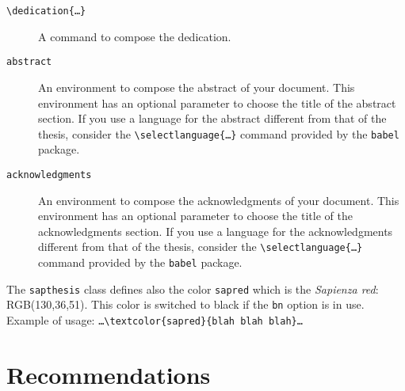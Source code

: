 \documentclass[a5paper,11pt]{article}
\newcommand{\bs}{\textbackslash}
\begin{document}
\begin{description}

\item[\texttt{\bs dedication\{\dots\}}] A command to compose the dedication.

\item[\texttt{abstract}] An environment to compose the abstract of your document. This environment has an optional parameter to choose the title of the abstract section.
If you use a language for the abstract different from that of the thesis, consider the \texttt{\bs selectlanguage\{\dots\}} command provided by the \texttt{babel} package.

\item[\texttt{acknowledgments}] An environment to compose the acknowledgments of your document. This environment has an optional parameter to choose the title of the acknowledgments section.
If you use a language for the acknowledgments different from that of the thesis, consider the \texttt{\bs selectlanguage\{\dots\}} command provided by the \texttt{babel} package.


\end{description}

The \texttt{sapthesis} class defines also the color \texttt{sapred} which is the \emph{Sapienza red}: RGB(130,36,51).
This color is switched to black if the \texttt{bn} option is in use. Example of usage: \texttt{\ldots \bs textcolor\{sapred\}\{blah blah blah\}\ldots}


\section{Recommendations}
\end{document}
